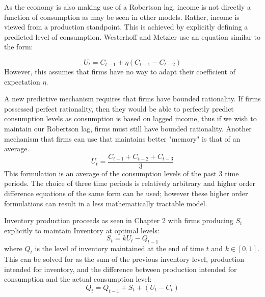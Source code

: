 As the economy is also making use of a Robertson lag, income is not directly a function of consumption as may be seen in other models. Rather, income is viewed from a production standpoint. This is achieved by explicitly defining a predicted level of consumption. Westerhoff and Metzler use an equation similar to the form:

\begin{equation*} 
    U_t=C_{t-1}+\eta(C_{t-1}-C_{t-2})
\end{equation*}
However, this assumes that firms have no way to adapt their coefficient of expectation $\eta$. 

A new predictive mechanism requires that firms have bounded rationality. If firms possessed perfect rationality, then they would be able to perfectly predict consumption levels as consumption is based on lagged income, thus if we wish to maintain our Robertson lag, firms must still have bounded rationality. Another mechanism that firms can use that maintains better "memory" is that of an average. 
\begin{equation}\label{predict}
    U_t = \frac{C_{t-1}+C_{t-2}+C_{t-3}}{3}
\end{equation}
This formulation is an average of the consumption levels of the past 3 time periods. The choice of three time periods is relatively arbitrary and higher order difference equations of the same form can be used; however these higher order formulations can result in a less mathematically tractable model.

Inventory production proceeds as seen in Chapter 2 with firms producing $S_t$ explicitly to maintain Inventory at optimal levels:
\begin{equation}
    S_t = k U_t-Q_{t-1}
\end{equation}
where $Q_t$ is the level of inventory maintained at the end of time $t$ and $k\in[0,1]$. This can be solved for as the sum of the previous inventory level, production intended for inventory, and the difference between production intended for consumption and the actual consumption level:
\begin{equation}
    Q_t=Q_{t-1}+S_t+(U_t-C_t)
\end{equation}

